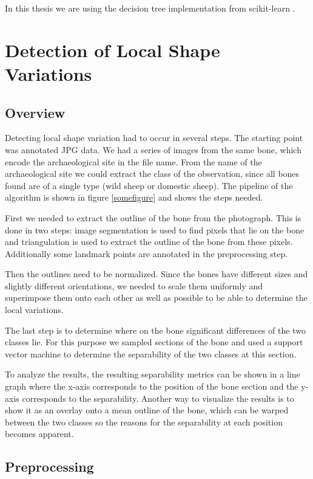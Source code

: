 \documentclass[pdftex,12pt,a4paper]{report}
\begin{document}
In this thesis we are using the decision tree implementation from scikit-learn \cite{pedregosa2011scikit}.

\chapter{Detection of Local Shape Variations}
\label{chapter:detecting-shape-variations}

\section{Overview}

Detecting local shape variation had to occur in several steps. The starting point was annotated JPG data. We had a series of images from the same bone, which encode the archaeological site in the file name. From the name of the archaeological site we could extract the class of the observation, since all bones found are of a single type (wild sheep or domestic sheep). The pipeline of the algorithm is shown in figure \ref{somefigure} and shows the steps needed.

First we needed to extract the outline of the bone from the photograph. This is done in two steps: image segmentation is used to find pixels that lie on the bone and triangulation is used to extract the outline of the bone from these pixels. Additionally some landmark points are annotated in the preprocessing step.

Then the outlines need to be normalized. Since the bones have different sizes and slightly different orientations, we needed to scale them uniformly and superimpose them onto each other as well as possible to be able to determine the local variations.

The last step is to determine where on the bone significant differences of the two classes lie. For this purpose we sampled sections of the bone and used a support vector machine to determine the separability of the two classes at this section.

To analyze the results, the resulting separability metrics can be shown in a line graph where the x-axis corresponds to the position of the bone section and the y-axis corresponds to the separability. Another way to visualize the results is to show it as an overlay onto a mean outline of the bone, which can be warped between the two classes so the reasons for the separability at each position becomes apparent.

\section{Preprocessing}
\end{document}
